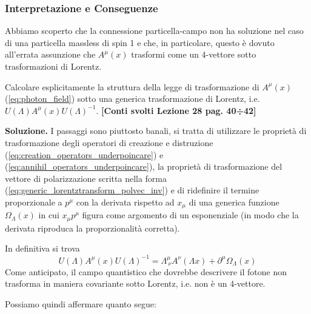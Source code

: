 \documentclass[../main.tex]{subfiles}
\begin{document}
\subsubsection{Interpretazione e Conseguenze}
Abbiamo scoperto che la connessione particella-campo non ha soluzione nel caso di una particella massless di spin 1 e che, in particolare, questo è dovuto all'errata assunzione che $A^\mu(x)$ trasformi come un 4-vettore sotto trasformazioni di Lorentz.

\begin{exercise}
    Calcolare esplicitamente la struttura della legge di trasformazione di $A^\mu(x)$ (\ref{eq:photon_field}) sotto una generica trasformazione di Lorentz, i.e. $U(\Lambda)A^\mu(x)U(\Lambda)^{-1}$. \textbf{[Conti svolti Lezione 28 pag. 40÷42]}

    \textbf{Soluzione. } 
    I passaggi sono piuttosto banali, si tratta di utilizzare le proprietà di trasformazione degli operatori di creazione e distruzione (\ref{eq:creation_operators_underpoincare}) e (\ref{eq:annihil_operators_underpoincare}), la proprietà di trasformazione del vettore di polarizzazione scritta nella forma (\ref{eq:generic_lorentztransform_polvec_inv}) e di ridefinire il termine proporzionale a $p^\mu$ con la derivata rispetto ad $x_\mu$ di una generica funzione $\Omega_\Lambda(x)$ in cui $x_\mu p^\mu$ figura come argomento di un esponenziale (in modo che la derivata riproduca la proporzionalità corretta).

    In definitiva si trova
    \begin{equation}
        \boxed{
        U(\Lambda)A^\mu(x)U(\Lambda)^{-1} = \Lambda^\mu_{~\nu} A^\nu(\Lambda x) + \partial^\mu \Omega_\Lambda(x)
        }
        \label{eq:generic_poincaretransform_photonfield}
    \end{equation}
    Come anticipato, il campo quantistico che dovrebbe descrivere il fotone non trasforma in maniera covariante sotto Lorentz, i.e. non è un 4-vettore.
\end{exercise}
Possiamo quindi affermare quanto segue:
\end{document}
